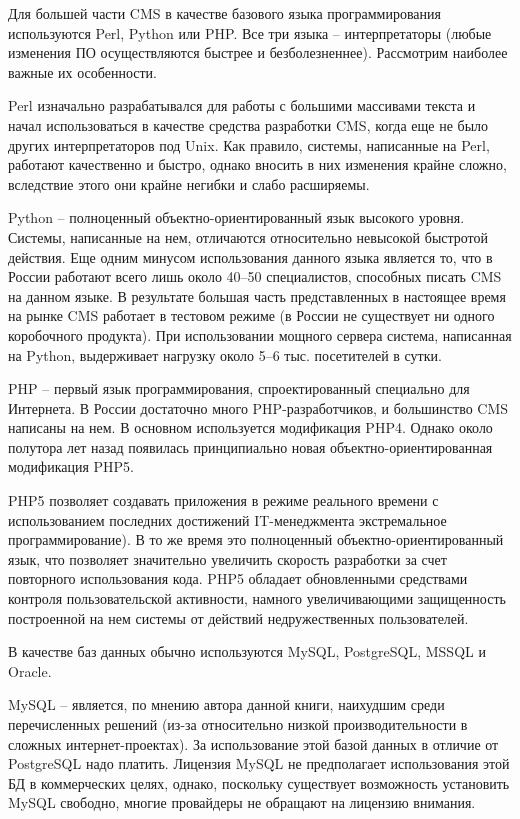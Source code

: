 \documentclass[a4paper,english,russian]{G2-105}
\begin{document}
\par Для большей части CMS  в качестве базового языка программирования используются Perl, Python  или PHP.  Все три языка – интерпретаторы (любые изменения ПО осуществляются быстрее и безболезненнее). Рассмотрим наиболее важные их особенности.
\par Perl  изначально разрабатывался для работы с большими массивами текста и начал использоваться в качестве средства разработки CMS,  когда еще не было других интерпретаторов под Unix.  Как правило, системы, написанные на Perl, работают качественно и быстро, однако вносить в них изменения крайне сложно, вследствие этого они крайне негибки и слабо расширяемы.
\par Python  – полноценный объектно-ориентированный язык высокого уровня. Системы, написанные на нем, отличаются относительно невысокой быстротой действия. Еще одним минусом использования данного языка является то, что в России работают всего лишь около 40–50 специалистов, способных писать CMS  на данном языке. В результате большая часть представленных в настоящее время на рынке CMS  работает в тестовом режиме (в России не существует ни одного коробочного продукта). При использовании мощного сервера система, написанная на Python,  выдерживает нагрузку около 5–6 тыс. посетителей в сутки.
\par PHP  – первый язык программирования, спроектированный специально для Интернета. В России достаточно много PHP-разработчиков, и большинство CMS написаны на нем. В основном используется модификация PHP4.  Однако около полутора лет назад появилась принципиально новая объектно-ориентированная модификация PHP5. 
\par PHP5 позволяет создавать приложения в режиме реального времени с использованием последних достижений IT-менеджмента экстремальное программирование). В то же время это полноценный объектно-ориентированный язык, что позволяет значительно увеличить скорость разработки за счет повторного использования кода. PHP5  обладает обновленными средствами контроля пользовательской активности, намного увеличивающими защищенность построенной на нем системы от действий недружественных пользователей.
\par В качестве баз данных обычно используются MySQL, PostgreSQL,  MSSQL и Oracle. 
\par MySQL  – является, по мнению автора данной книги, наихудшим среди перечисленных решений (из-за относительно низкой производительности в сложных интернет-проектах). За использование этой базой данных в отличие от PostgreSQL надо платить. Лицензия MySQL  не предполагает использования этой БД в коммерческих целях, однако, поскольку существует возможность установить MySQL свободно, многие провайдеры не обращают на лицензию внимания.
\end{document}
